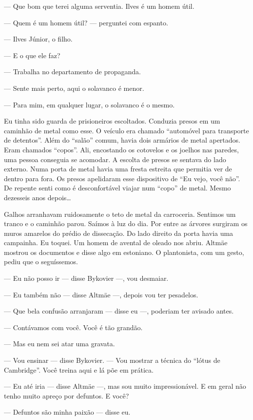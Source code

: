 --- Que bom que terei alguma serventia. Ilves é um homem útil.

--- Quem é um homem útil? --- perguntei com espanto.

--- Ilves Júnior, o filho.

--- E o que ele faz?

--- Trabalha no departamento de propaganda.

--- Sente mais perto, aqui o solavanco é menor.

--- Para mim, em qualquer lugar, o solavanco é o mesmo.

Eu tinha sido guarda de prisioneiros escoltados. Conduzia presos em um
caminhão de metal como esse. O veículo era chamado ``automóvel para
transporte de detentos''. Além do ``salão'' comum, havia dois armários
de metal apertados. Eram chamados ``copos''. Ali, encostando os
cotovelos e os joelhos nas paredes, uma pessoa conseguia se acomodar. A
escolta de presos se sentava do lado externo. Numa porta de metal havia
uma fresta estreita que permitia ver de dentro para fora. Os presos
apelidaram esse dispositivo de ``Eu vejo, você não''. De repente senti
como é desconfortável viajar num ``copo'' de metal. Mesmo dezesseis anos
depois\ldots{}

Galhos arranhavam ruidosamente o teto de metal da carroceria. Sentimos um
tranco e o caminhão parou. Saímos à luz do dia. Por entre as árvores
surgiram os muros amarelos do prédio de dissecação. Do lado direito da
porta havia uma campainha. Eu toquei. Um homem de avental de oleado nos
abriu. Altmäe mostrou os documentos e disse algo em estoniano. O
plantonista, com um gesto, pediu que o seguíssemos.

--- Eu não posso ir --- disse Bykovier ---, vou desmaiar.

--- Eu também não --- disse Altmäe ---, depois vou ter pesadelos.

--- Que bela confusão arranjaram --- disse eu ---, poderiam ter avisado
antes.

--- Contávamos com você. Você é tão grandão.

--- Mas eu nem sei atar uma gravata.

--- Vou ensinar --- disse Bykovier. --- Vou mostrar a técnica do ``lótus
de Cambridge''. Você treina aqui e lá põe em prática.

--- Eu até iria --- disse Altmäe ---, mas sou muito impressionável. E em
geral não tenho muito apreço por defuntos. E você?

--- Defuntos são minha paixão --- disse eu.

